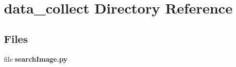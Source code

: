 \section{data\+\_\+collect Directory Reference}
\label{dir_b8cadcda3910d8ff5575196d24cfffa0}
\subsection*{Files}
\begin{DoxyCompactItemize}
\item 
file {\bf search\+Image.\+py}
\end{DoxyCompactItemize}
